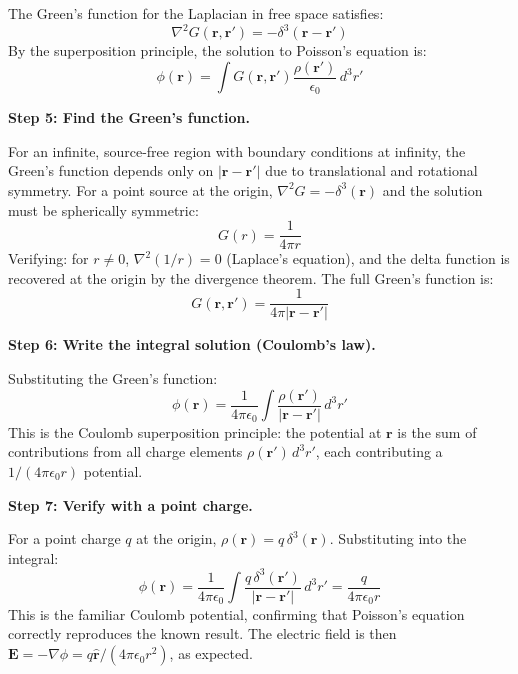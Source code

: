 The Green's function for the Laplacian in free space satisfies:
\begin{equation}
\nabla^2 G(\mathbf{r},\mathbf{r}') = -\delta^3(\mathbf{r} - \mathbf{r}')
\end{equation}
By the superposition principle, the solution to Poisson's equation is:
\begin{equation}
\phi(\mathbf{r}) = \int G(\mathbf{r},\mathbf{r}')\frac{\rho(\mathbf{r}')}{\epsilon_0}\,d^3r'
\end{equation}

\textbf{Step 5: Find the Green's function.}

For an infinite, source-free region with boundary conditions at infinity, the Green's function depends only on $|\mathbf{r} - \mathbf{r}'|$ due to translational and rotational symmetry. For a point source at the origin, $\nabla^2 G = -\delta^3(\mathbf{r})$ and the solution must be spherically symmetric:
\begin{equation}
G(r) = \frac{1}{4\pi r}
\end{equation}
Verifying: for $r \neq 0$, $\nabla^2(1/r) = 0$ (Laplace's equation), and the delta function is recovered at the origin by the divergence theorem. The full Green's function is:
\begin{equation}
G(\mathbf{r},\mathbf{r}') = \frac{1}{4\pi|\mathbf{r} - \mathbf{r}'|}
\end{equation}

\textbf{Step 6: Write the integral solution (Coulomb's law).}

Substituting the Green's function:
\begin{equation}
\phi(\mathbf{r}) = \frac{1}{4\pi\epsilon_0}\int\frac{\rho(\mathbf{r}')}{|\mathbf{r} - \mathbf{r}'|}\,d^3r'
\end{equation}
This is the Coulomb superposition principle: the potential at $\mathbf{r}$ is the sum of contributions from all charge elements $\rho(\mathbf{r}')\,d^3r'$, each contributing a $1/(4\pi\epsilon_0 r)$ potential.

\textbf{Step 7: Verify with a point charge.}

For a point charge $q$ at the origin, $\rho(\mathbf{r}) = q\,\delta^3(\mathbf{r})$. Substituting into the integral:
\begin{equation}
\phi(\mathbf{r}) = \frac{1}{4\pi\epsilon_0}\int\frac{q\,\delta^3(\mathbf{r}')}{|\mathbf{r} - \mathbf{r}'|}\,d^3r' = \frac{q}{4\pi\epsilon_0 r}
\end{equation}
This is the familiar Coulomb potential, confirming that Poisson's equation correctly reproduces the known result. The electric field is then $\mathbf{E} = -\nabla\phi = q\hat{\mathbf{r}}/(4\pi\epsilon_0 r^2)$, as expected.


